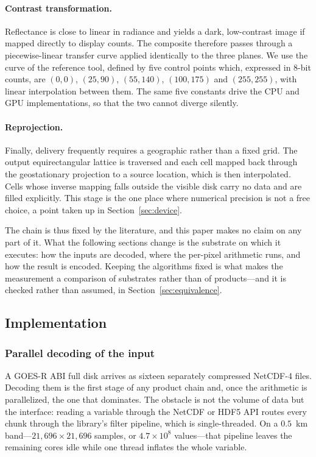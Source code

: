 \documentclass[11pt]{article}
\begin{document}
\paragraph{Contrast transformation.}
Reflectance is close to linear in radiance and yields a dark, low-contrast
image if mapped directly to display counts. The composite therefore passes
through a piecewise-linear transfer curve applied identically to the three
planes. We use the curve of the reference tool, defined by five control points
which, expressed in $8$-bit counts, are $(0,0)$, $(25,90)$, $(55,140)$,
$(100,175)$ and $(255,255)$, with linear interpolation between them. The same
five constants drive the CPU and GPU implementations, so that the two cannot
diverge silently.

\paragraph{Reprojection.}
Finally, delivery frequently requires a geographic rather than a fixed grid.
The output equirectangular lattice is traversed and each cell mapped back
through the geostationary projection to a source location, which is then
interpolated. Cells whose inverse mapping falls outside the visible disk carry
no data and are filled explicitly. This stage is the one place where numerical
precision is not a free choice, a point taken up in
Section~\ref{sec:device}.

The chain is thus fixed by the literature, and this paper makes no claim on any
part of it. What the following sections change is the substrate on which it
executes: how the inputs are decoded, where the per-pixel arithmetic runs, and
how the result is encoded. Keeping the algorithms fixed is what makes the
measurement a comparison of substrates rather than of products---and it is
checked rather than assumed, in Section~\ref{sec:equivalence}.

\subsection{Implementation}
\label{sec:implementation}

\subsubsection{Parallel decoding of the input}
\label{sec:decoding}

A GOES-R ABI full disk arrives as sixteen separately compressed NetCDF-4 files.
Decoding them is the first stage of any product chain and, once the arithmetic
is parallelized, the one that dominates. The obstacle is not the volume of data
but the interface: reading a variable through the NetCDF or HDF5 API routes
every chunk through the library's filter pipeline, which is single-threaded. On
a $0.5$~km band---$21{,}696 \times 21{,}696$ samples, or $4.7 \times 10^{8}$
values---that pipeline leaves the remaining cores idle while one thread
inflates the whole variable.
\end{document}
